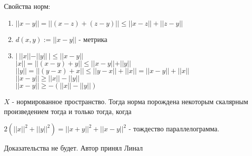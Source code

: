     \begin{theorem-non}
        Свойства норм:
        \begin{enumerate}
            \item $||x-y||=||(x-z)+(z-y)|| \leqslant ||x-z||+||z-y||$
            \item $d(x, y):=||x-y||$ - метрика
            \item $|\ ||x||-||y||\ | \leqslant ||x-y||$ \\
            $|x|| = ||(x-y)+y|| \leqslant ||x-y||+||y||$ \\
            $||y|| = ||(y-x)+x|| \leqslant ||y-x||+||x||=||x-y||+||x||$ \\
            $||x-y||\geqslant ||x||-||y||$ \\
            $||x-y||\geqslant -(||x||-||y||)$
        \end{enumerate}
    \end{theorem-non}
    \begin{theorem-non}
        $X$ - нормированное пространство. Тогда норма порождена некоторым скалярным произведением тогда и только тогда, когда
    
        $2(||x||^2+||y||^2)=||x+y||^2+||x-y||^2$ - тождество параллелограмма.
    
        Доказательства не будет. Автор принял Линал
    \end{theorem-non}